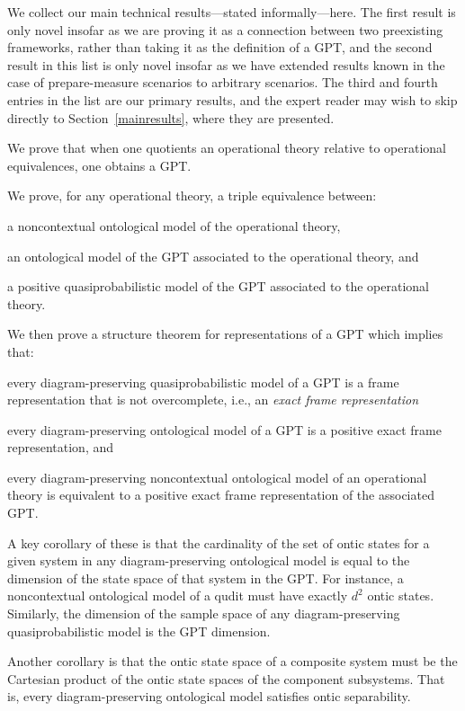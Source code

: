 \documentclass[10pt,twocolumn,aps,groupedaddress,nofootinbib]{revtex4}
\begin{document}
We collect our main technical results---stated informally---here.
The first result is only novel insofar as we are proving it as a connection between two preexisting frameworks, rather than taking it as the definition of a GPT, and
 the second result in this list is only novel insofar as we have extended results known in the case of prepare-measure scenarios to arbitrary scenarios. The third and fourth entries in the list are our primary results, and the expert reader may wish to skip directly to Section~\ref{mainresults}, where they are presented.

\ben
\item We prove that when one quotients an operational theory relative to operational equivalences, one obtains a GPT.
\item We prove, for any operational theory, a triple equivalence between:
\bit
\item a noncontextual ontological model of the operational theory,
 \item an ontological model of the GPT associated to the operational theory, and
\item a positive quasiprobabilistic model of the GPT associated to the operational theory.
\eit
\item We then prove a structure theorem for representations of a GPT which implies that:
\ben
\item every diagram-preserving quasiprobabilistic model of a GPT is a frame representation that is not overcomplete, i.e., an {\em exact frame representation}
\item every diagram-preserving ontological model of a GPT is a positive exact frame representation, and
\item every diagram-preserving noncontextual ontological model of an operational theory is equivalent to a positive exact frame representation of the associated GPT.
\een
\item A key corollary of these is that the cardinality of the set of ontic states for a given system in
any diagram-preserving ontological model is equal to the dimension of the state space of that system in
the GPT. For instance, a noncontextual ontological model of a qudit must have exactly $d^2$ ontic states. Similarly, the dimension of the sample space of any diagram-preserving quasiprobabilistic model is the GPT dimension.
\item Another corollary is that the ontic state space of a composite system must be the Cartesian product of the ontic state spaces of the component subsystems. That is, every diagram-preserving ontological model satisfies ontic separability.
\een
\end{document}
